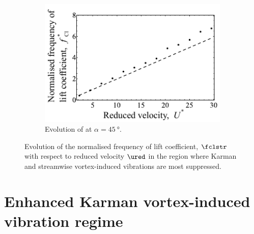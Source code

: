 \documentclass[a4paper,fleqn]{cas-sc}
\begin{document}
\begin{figure}
  \centering
  \begin{subfigure}[h]{0.38\textwidth}
    \includegraphics[width=\textwidth]{figs/clFreq3}
    \caption{Evolution of at $\alpha = \SI{45}{\degree}$.}
    \label{fig:clFreq3}
  \end{subfigure}

  \caption{Evolution of the normalised frequency of lift coefficient, $\fclstr$ with respect to reduced velocity $\ured$ in the region where Karman and streamwise vortex-induced vibrations are most suppressed.} \label{fig:clFreqSuppressed}
\end{figure}

\section{Enhanced Karman vortex-induced vibration regime}\label{sec:enhKarmanRegime}
\end{document}
